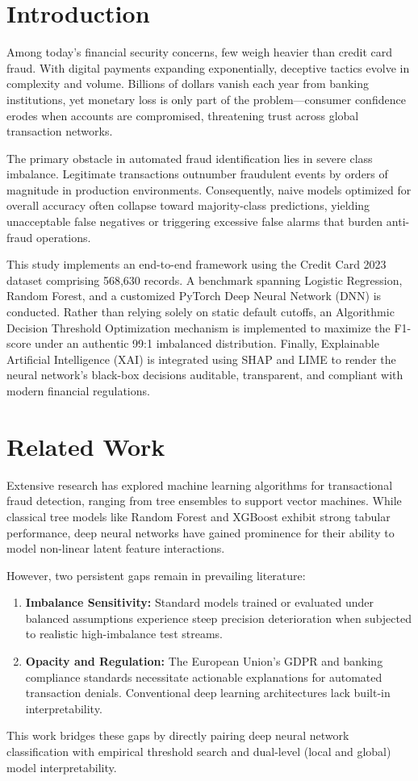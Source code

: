 \documentclass[conference]{IEEEtran}
\begin{document}
\section{Introduction}
Among today's financial security concerns, few weigh heavier than credit card fraud. With digital payments expanding exponentially, deceptive tactics evolve in complexity and volume. Billions of dollars vanish each year from banking institutions, yet monetary loss is only part of the problem---consumer confidence erodes when accounts are compromised, threatening trust across global transaction networks.

The primary obstacle in automated fraud identification lies in severe class imbalance. Legitimate transactions outnumber fraudulent events by orders of magnitude in production environments. Consequently, naive models optimized for overall accuracy often collapse toward majority-class predictions, yielding unacceptable false negatives or triggering excessive false alarms that burden anti-fraud operations.

This study implements an end-to-end framework using the Credit Card 2023 dataset comprising 568,630 records. A benchmark spanning Logistic Regression, Random Forest, and a customized PyTorch Deep Neural Network (DNN) is conducted. Rather than relying solely on static default cutoffs, an Algorithmic Decision Threshold Optimization mechanism is implemented to maximize the F1-score under an authentic 99:1 imbalanced distribution. Finally, Explainable Artificial Intelligence (XAI) is integrated using SHAP and LIME to render the neural network's black-box decisions auditable, transparent, and compliant with modern financial regulations.

\section{Related Work}
Extensive research has explored machine learning algorithms for transactional fraud detection, ranging from tree ensembles to support vector machines. While classical tree models like Random Forest and XGBoost exhibit strong tabular performance, deep neural networks have gained prominence for their ability to model non-linear latent feature interactions.

However, two persistent gaps remain in prevailing literature:
\begin{enumerate}
    \item \textbf{Imbalance Sensitivity:} Standard models trained or evaluated under balanced assumptions experience steep precision deterioration when subjected to realistic high-imbalance test streams.
    \item \textbf{Opacity and Regulation:} The European Union's GDPR and banking compliance standards necessitate actionable explanations for automated transaction denials. Conventional deep learning architectures lack built-in interpretability.
\end{enumerate}
This work bridges these gaps by directly pairing deep neural network classification with empirical threshold search and dual-level (local and global) model interpretability.
\end{document}
